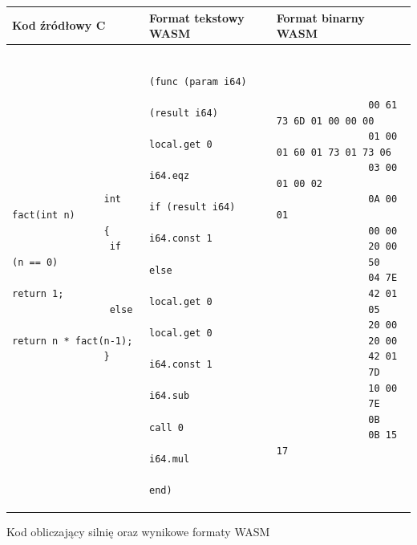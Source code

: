 \documentclass[language=polish,type=master]{aghmodern}
\begin{document}
\begin{listing}[H]
    \begin{center}
        \begin{tabular}{ |p{}|p{}|p{}| }

            \hline
            Kod źródłowy C & Format tekstowy WASM & Format binarny WASM \\
            \hline

            \begin{verbatim}
                int fact(int n)
                {
                 if (n == 0)
                  return 1;
                 else
                  return n * fact(n-1);
                }
            \end{verbatim}

                           &

            \begin{verbatim}
                (func (param i64)
                      (result i64)
                    local.get 0
                    i64.eqz
                    if (result i64)
                        i64.const 1
                    else
                        local.get 0
                        local.get 0
                        i64.const 1
                        i64.sub
                        call 0
                        i64.mul
                    end)
            \end{verbatim}

                           &

            \begin{verbatim}
                00 61 73 6D 01 00 00 00
                01 00 01 60 01 73 01 73 06
                03 00 01 00 02
                0A 00 01
                00 00
                20 00
                50
                04 7E
                42 01
                05
                20 00
                20 00
                42 01
                7D
                10 00
                7E
                0B
                0B 15 17
            \end{verbatim}

            \\

            \hline
        \end{tabular}
    \end{center}

    \caption{Kod obliczający silnię oraz wynikowe formaty WASM}
    \label{lst:wasm}

\end{listing}
\end{document}

